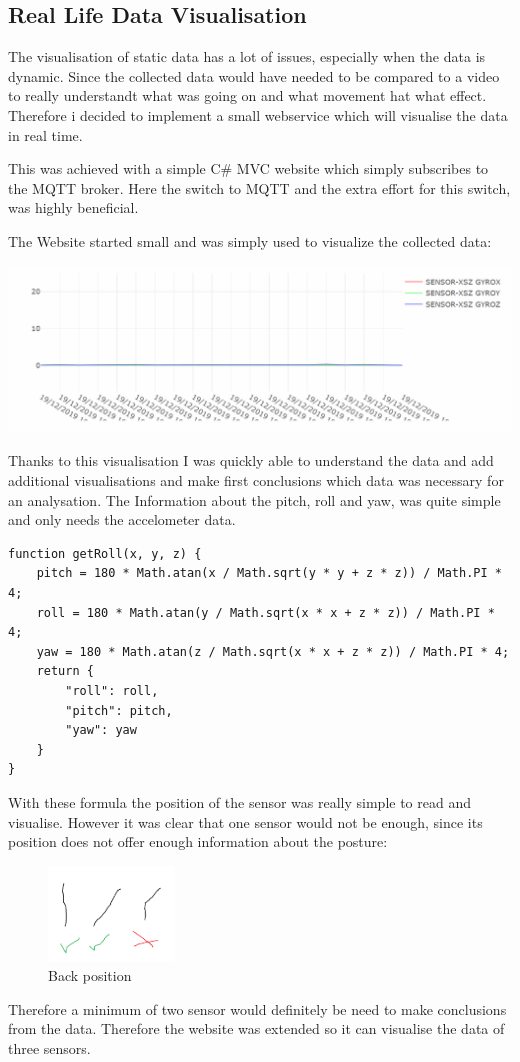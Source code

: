 \subsection{Real Life Data Visualisation}

The visualisation of static data has a lot of issues, especially when the data is dynamic. Since the collected data would have needed to be compared to a video to really understandt what was going on and what movement hat what effect. Therefore i decided to implement a small webservice which will visualise the data in real time. 

This was achieved with a simple C\# MVC website which simply subscribes to the MQTT broker. Here the switch to MQTT and the extra effort for this switch, was highly beneficial.

The Website started small and was simply used to visualize the collected data:

\includegraphics[width=\linewidth]{images/WebVisualisation_SIMPLE.png}

Thanks to this visualisation I was quickly able to understand the data and add additional visualisations and make first conclusions which data was necessary for an analysation.
The Information about the pitch, roll and yaw, was quite simple and only needs the accelometer data.

\begin{lstlisting}
function getRoll(x, y, z) {
    pitch = 180 * Math.atan(x / Math.sqrt(y * y + z * z)) / Math.PI * 4;
    roll = 180 * Math.atan(y / Math.sqrt(x * x + z * z)) / Math.PI * 4;
    yaw = 180 * Math.atan(z / Math.sqrt(x * x + z * z)) / Math.PI * 4;
    return {
        "roll": roll,
        "pitch": pitch,
        "yaw": yaw
    }
}
\end{lstlisting}

With these formula the position of the sensor was really simple to read and visualise. However it was clear that one sensor would not be enough, since its position does not offer enough information about the posture: 

\begin{figure}
  \begin{center}
\includegraphics[width=0.3\textwidth]{images/Backposition.png}
  \end{center}
  \caption{Back position}
  \label{fig:BackPos}
\end{figure}

Therefore a minimum of two sensor would definitely be need to make conclusions from the data. Therefore the website was extended so it can visualise the data of three sensors.